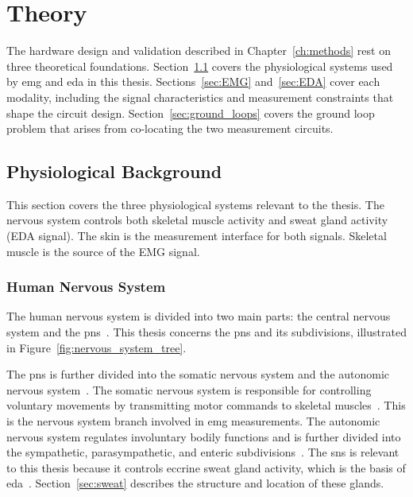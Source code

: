 \chapter{Theory}
\label{ch:theory}

The hardware design and validation described in Chapter~\ref{ch:methods} rest on three theoretical foundations. Section~\ref{sec:human_physiology} covers the physiological systems used by \gls{emg} and \gls{eda} in this thesis. Sections~\ref{sec:EMG} and~\ref{sec:EDA} cover each modality, including the signal characteristics and measurement constraints that shape the circuit design. Section~\ref{sec:ground_loops} covers the ground loop problem that arises from co-locating the two measurement circuits.

\section{Physiological Background} \label{sec:human_physiology}

This section covers the three physiological systems relevant to the thesis. The nervous system controls both skeletal muscle activity and sweat gland activity (EDA signal). The skin is the measurement interface for both signals. Skeletal muscle is the source of the EMG signal.

\subsection{Human Nervous System} \label{sec:human_nervous_system}

The human nervous system is divided into two main parts: the central nervous system and the \gls{pns}~\cite{bazira_overview_2021}. This thesis concerns the \gls{pns} and its subdivisions, illustrated in Figure~\ref{fig:nervous_system_tree}.

The \gls{pns} is further divided into the somatic nervous system and the autonomic nervous system~\cite{bazira_overview_2021}. The somatic nervous system is responsible for controlling voluntary movements by transmitting motor commands to skeletal muscles~\cite{bazira_overview_2021, kamen_essentials_2010}. This is the nervous system branch involved in \gls{emg} measurements. The autonomic nervous system regulates involuntary bodily functions and is further divided into the sympathetic, parasympathetic, and enteric subdivisions~\cite{bazira_overview_2021}. The \gls{sns} is relevant to this thesis because it controls eccrine sweat gland activity, which is the basis of \gls{eda}~\cite{boucsein_electrodermal_2012, ellaway_sweat_2010, banganho_electrodermal_2022}. Section~\ref{sec:sweat} describes the structure and location of these glands.

